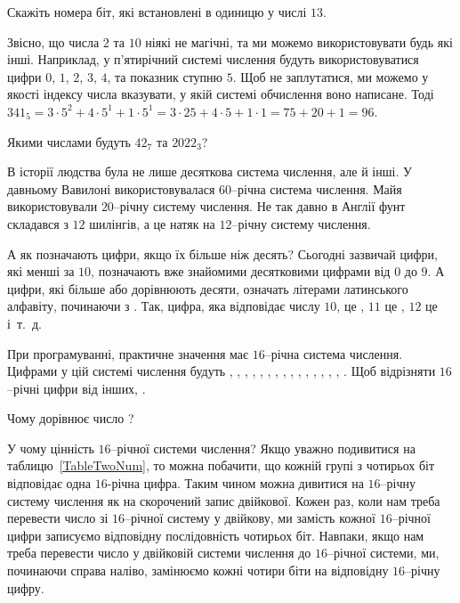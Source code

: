 \begin{exercise}
Скажіть номера біт, які встановлені в одиницю у числі $13$.
\end{exercise}

Звісно, що числа $2$ та $10$ ніякі не магічні, та ми можемо використовувати будь які інші.
Наприклад, у п'ятирічний системі числення будуть використовуватися цифри $0$, $1$, $2$, $3$, $4$, та показник ступню $5$.
Щоб не заплутатися, ми можемо у якості індексу числа вказувати, у якій системі обчислення воно написане.
Тоді $341_5 = 3 \cdot 5^2 + 4 \cdot 5^1 + 1 \cdot 5^1 = 3 \cdot 25 + 4 \cdot 5 + 1 \cdot 1 = 75 + 20 + 1 = 96$.

\begin{exercise}
Якими числами будуть $42_7$ та $2022_3$?
\end{exercise}

В історії людства була не лише десяткова система числення, але й інші.
У давньому Вавилоні використовувалася $60$--річна система числення.
Майя використовували $20$--річну систему числення.
Не так давно в Англії фунт складався з $12$ шилінгів, а це натяк на $12$--річну систему числення.

А як позначають цифри, якщо їх більше ніж десять?
Сьогодні зазвичай цифри, які менші за $10$, позначають вже знайомими десятковими цифрами від $0$ до $9$.
А цифри, які більше або дорівнюють десяти, означать літерами латинського алфавіту, починаючи з .
Так, цифра, яка відповідає числу $10$, це , $11$ це , $12$ це  і~т.~д.

При програмуванні, практичне значення має $16$--річна система числення.
Цифрами у цій системі числення будуть , , , , , , , , , , , , , , , .
Щоб відрізняти $16$--річні цифри від інших, \hexdesc.

\begin{exercise}
Чому дорівнює число ?
\end{exercise}

У чому цінність $16$--річної системи числення?
Якщо уважно подивитися на таблицю~\ref{TableTwoNum}, то можна побачити, що кожній групі з чотирьох біт відповідає одна $16$-річна цифра.
Таким чином можна дивитися на $16$--річну систему числення як на скорочений запис двійкової.
Кожен раз, коли нам треба перевести число зі $16$--річної систему у двійкову, ми замість кожної $16$--річної цифри записуємо відповідну послідовність чотирьох біт.
Навпаки, якщо нам треба перевести число у двійковій системи числення до $16$--річної системи, ми, починаючи справа наліво, замінюємо кожні чотири біти на відповідну $16$--річну цифру.

